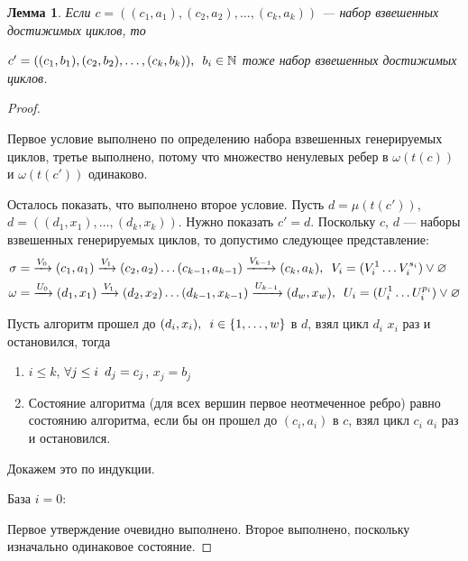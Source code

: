 \documentclass{article}
\newcommand{\squad}{
    \hspace{0.5em}
}
\newtheorem{lemma}{Лемма}
\begin{document}
\begin{lemma}
    \label{lemma:induction}
    Если $c = ((c_{1}, a_{1}), (c_{2}, a_{2}), \ldots, (c_{k}, a_{k}))$ --- набор взвешенных достижимых циклов, то 

    \noindent
    $c' = ((c_{1}, b_{1}), (c_{2}, b_{2}), \ldots, (c_{k}, b_{k})), \squad b_{i} \in \mathbb{N}$ тоже набор взвешенных достижимых циклов.
\end{lemma}
\begin{proof} $ $
    
    Первое условие выполнено по определению набора взвешенных генерируемых циклов, третье выполнено, потому что множество ненулевых ребер в $\omega(t(c))$ и $\omega(t(c'))$ одинаково.

    Осталось показать, что выполнено второе условие. Пусть $d = \mu(t(c'))$, $d = ((d_{1}, x_{1}), \ldots, (d_{k}, x_{k}))$. Нужно показать $c' = d$.
    Поскольку $c$, $d$ --- наборы взвешенных генерируемых циклов, то допустимо следующее представление:
    \begin{align*}
         \sigma = &\xrightarrow{V_{0}} (c_{1}, a_{1}) \xrightarrow{V_{1}} (c_{2}, a_{2}) \ldots (c_{k - 1}, a_{k - 1}) \xrightarrow{V_{k - 1}} (c_{k}, a_{k}), \squad V_{i} = (V_{i}^{1} \ldots V_{i}^{s_{i}}) \lor \varnothing \\
         \omega = &\xrightarrow{U_{0}} (d_{1}, x_{1}) \xrightarrow{V_{1}} (d_{2}, x_{2}) \ldots (d_{k - 1}, x_{k - 1}) \xrightarrow{U_{k - 1}} (d_{w}, x_{w}), \squad U_{i} = (U_{i}^{1} \ldots U_{i}^{p_{i}}) \lor \varnothing \\
    \end{align*}

    Пусть алгоритм прошел до $(d_{i}, x_{i}), \squad i \in \{1, \ldots, w\}$ в $d$, взял цикл $d_{i}$ $x_{i}$ раз и остановился, тогда
    \begin{enumerate}
        \item $i \leq k$, $\forall j \leq i \squad d_{j} = c_{j}$, $x_{j} = b_{j}$ \\
        \item Состояние алгоритма (для всех вершин первое неотмеченное ребро) равно состоянию алгоритма, если бы он прошел до $(c_{i}, a_{i})$ в $c$, взял цикл $c_{i}$ $a_{i}$ раз и остановился.
    \end{enumerate}
    Докажем это по индукции.

    База $i = 0$:

    Первое утверждение очевидно выполнено. Второе выполнено, поскольку изначально одинаковое состояние.


\end{proof}
\end{document}
